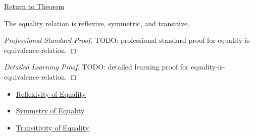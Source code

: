\newpage
{}
\label{prf:equality-is-equivalence-relation}

\begin{remark*}[Return]
\hyperref[cor:equality-is-equivalence-relation]{Return to Theorem}
\end{remark*}

\begin{corollary*}
The equality relation is reflexive, symmetric, and transitive.
\end{corollary*}

\begin{proof}[Professional Standard Proof]
\LRAProofBodyStart
TODO: professional standard proof for equality-is-equivalence-relation.
\end{proof}

\begin{proof}[Detailed Learning Proof]
\LRAProofBodyStart
TODO: detailed learning proof for equality-is-equivalence-relation.
\end{proof}

\begin{remark*}
\end{remark*}

\begin{dependencies}
\begin{itemize}
  \item \hyperref[ax:equality-reflexivity]{Reflexivity of Equality}
  \item \hyperref[thm:equality-symmetry]{Symmetry of Equality}
  \item \hyperref[thm:equality-transitivity]{Transitivity of Equality}
\end{itemize}
\end{dependencies}

\clearpage

